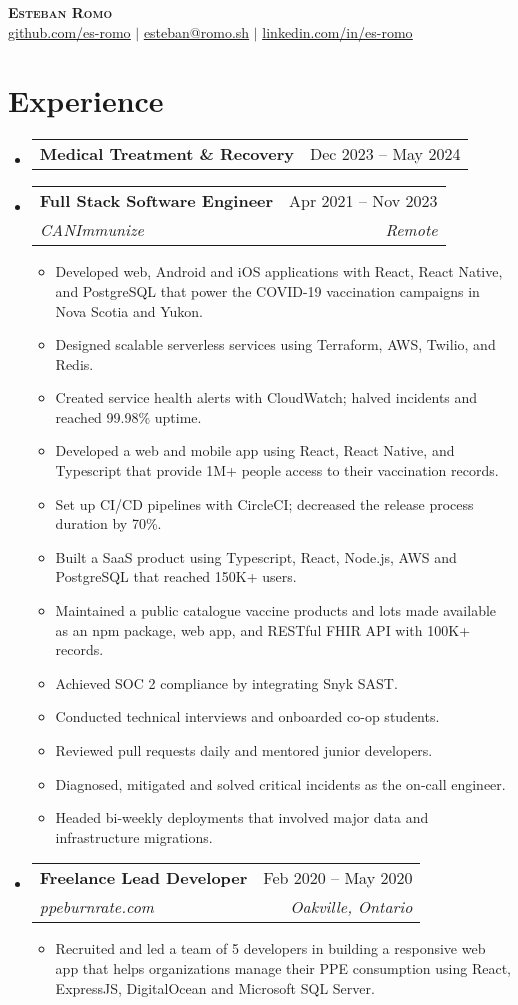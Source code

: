 \documentclass[letterpaper,11pt]{article}
\makeatletter
\newcommand{\resumeItem}[1]{
  \item\small{#1}
}
\newcommand{\resumeSubheading}[4]{
  \vspace{-2pt}\item
    \begin{tabular*}{0.97\textwidth}[t]{l@{\extracolsep{\fill}}r}
      \textbf{#1} & #2 \\
      \textit{\small#3} & \textit{\small #4} \\
    \end{tabular*}\vspace{-7pt}
}
\newcommand{\resumeSubheadingSmall}[2]{
  \vspace{-2pt}\item
    \begin{tabular*}{0.97\textwidth}[t]{l@{\extracolsep{\fill}}r}
      \textbf{#1} & #2 \\
    \end{tabular*}\vspace{-7pt}
}
\newcommand{\resumeSubHeadingListStart}{\begin{itemize}[leftmargin=0.15in, label={}]}
\newcommand{\resumeSubHeadingListEnd}{\end{itemize}}
\newcommand{\resumeItemListStart}{\begin{itemize}}
\newcommand{\resumeItemListEnd}{\end{itemize}}
\makeatother
\begin{document}
\begin{center}
    \textbf{\Huge \scshape Esteban Romo} \\ \vspace{1pt}
    \href{https://github.com/es-romo}{\underline{github.com/es-romo}} $|$ 
    \href{mailto:esteban@romo.sh}{\underline{esteban@romo.sh}} $|$ 
    \href{https://www.linkedin.com/in/es-romo/}{\underline{linkedin.com/in/es-romo}}
\end{center}

\section{Experience}
  \resumeSubHeadingListStart
    \resumeSubheadingSmall
    {Medical Treatment \& Recovery}{Dec 2023 -- May 2024}
    \resumeSubheading
      {Full Stack Software Engineer}{Apr 2021 -- Nov 2023}
      {CANImmunize}{Remote}
      \resumeItemListStart
        \resumeItem{Developed web, Android and iOS applications with React, React Native, and PostgreSQL that power the COVID-19 vaccination campaigns in Nova Scotia and Yukon.}
        \resumeItem{Designed scalable serverless services using Terraform, AWS, Twilio, and Redis.}
        \resumeItem{Created service health alerts with CloudWatch; halved incidents and reached 99.98\% uptime.}
        \resumeItem{Developed a web and mobile app using React, React Native, and Typescript that provide 1M+ people access to their vaccination records.}
        \resumeItem{Set up CI/CD pipelines with CircleCI; decreased the release process duration by 70\%.}
        \resumeItem{Built a SaaS product using Typescript, React, Node.js, AWS and PostgreSQL that reached 150K+ users.}
        \resumeItem{Maintained a public catalogue vaccine products and lots made available as an npm package, web app, and RESTful FHIR API with 100K+ records.}
        \resumeItem{Achieved SOC 2 compliance by integrating Snyk SAST.}
        \resumeItem{Conducted technical interviews and onboarded co-op students.}
        \resumeItem{Reviewed pull requests daily and mentored junior developers.}
        \resumeItem{Diagnosed, mitigated and solved critical incidents as the on-call engineer.}
        \resumeItem{Headed bi-weekly deployments that involved major data and infrastructure migrations.}
      \resumeItemListEnd
    \resumeSubheading
      {Freelance Lead Developer}{Feb 2020 -- May 2020}
      {ppeburnrate.com}{Oakville, Ontario}
      \resumeItemListStart
        \resumeItem{Recruited and led a team of 5 developers in building a responsive web app that helps organizations manage their PPE consumption using React, ExpressJS, DigitalOcean and Microsoft SQL Server.}
      \resumeItemListEnd
  \resumeSubHeadingListEnd
\end{document}
